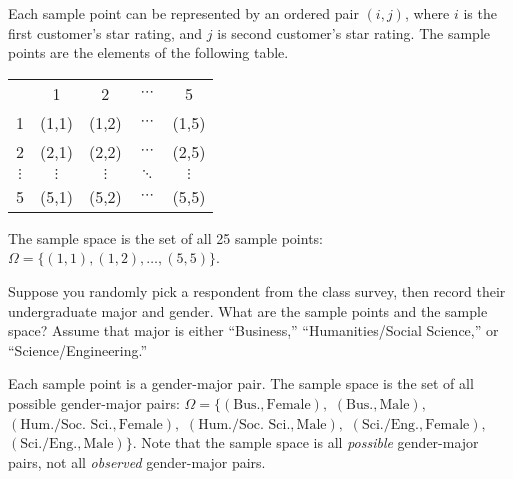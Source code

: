 \documentclass[answers,11pt]{exam}
\begin{document}
\begin{questions}
\begin{solution}
Each sample point can be represented by an ordered pair $(i,j)$, where $i$ is
the first customer's star rating, and $j$ is second customer's star rating.  The
sample points are the elements of the following table.
\begin{center}
\begin{tabular}{c|c|c|c|c|}
\multicolumn{1}{c}{} &
\multicolumn{1}{c}{1} &
\multicolumn{1}{c}{2} &
\multicolumn{1}{c}{$\cdots$} &
\multicolumn{1}{c}{5} \\
\cline{2-5}
1 & (1,1) & (1,2) & $\cdots$ & (1,5) \\
\cline{2-5}
2 & (2,1) & (2,2) & $\cdots$ & (2,5) \\
\cline{2-5}
$\vdots$ & $\vdots$ & $\vdots$ & $\ddots$ & $\vdots$ \\
\cline{2-5}
5 & (5,1) & (5,2) & $\cdots$ & (5,5) \\
\cline{2-5}
\end{tabular}
\end{center}
The sample space is the set of all 25 sample points: $\Omega = \{ (1,1), (1,2),
\dotsc, (5,5) \}$.
\end{solution}



\newpage
\question Suppose you randomly pick a respondent from the class survey, then
record their undergraduate major and gender.  What are the sample points and the sample space?
Assume that major is either ``Business,'' ``Humanities/Social Science,'' or
``Science/Engineering.''

\begin{solution}
Each sample point is a gender-major pair.  The sample space is the set of all
possible gender-major pairs: $\Omega = \{ (\text{Bus.}, \text{Female}),$
$(\text{Bus.}, \text{Male}),$
$(\text{Hum./Soc.~Sci.}, \text{Female}),$
$(\text{Hum./Soc.~Sci.}, \text{Male}),$
$(\text{Sci./Eng.}, \text{Female}),$
$(\text{Sci./Eng.}, \text{Male}) \}$.
Note that the sample space is all \emph{possible} gender-major pairs, not all
\emph{observed} gender-major pairs.
\end{solution}






\end{questions}
\end{document}
